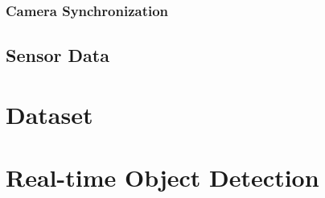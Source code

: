 \documentclass{erauthesis}
\begin{document}
\subsection{Camera Synchronization} \label{time_sync_lan}

\section{Sensor Data}





\chapter{Dataset} \label{dataset}

\chapter{Real-time Object Detection} \label{object-detection}
\end{document}
